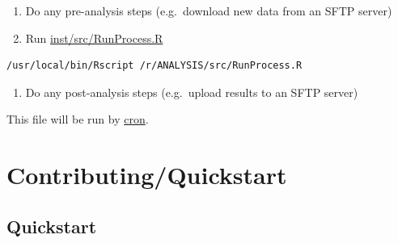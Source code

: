 \documentclass[12pt,]{article}
\providecommand{\tightlist}{%
  \setlength{\itemsep}{0pt}\setlength{\parskip}{0pt}}
\begin{document}
\begin{enumerate}
\def\labelenumi{\arabic{enumi}.}
\tightlist
\item
  Do any pre-analysis steps (e.g.~download new data from an SFTP server)
\item
  Run \protect\hyperlink{RunProcess}{inst/src/RunProcess.R}
\end{enumerate}

\begin{verbatim}
/usr/local/bin/Rscript /r/ANALYSIS/src/RunProcess.R
\end{verbatim}

\begin{enumerate}
\def\labelenumi{\arabic{enumi}.}
\setcounter{enumi}{2}
\tightlist
\item
  Do any post-analysis steps (e.g.~upload results to an SFTP server)
\end{enumerate}

This file will be run by \protect\hyperlink{cron}{cron}.

\section{Contributing/Quickstart}\label{contributingquickstart}

\hypertarget{quickstart}{\subsection{Quickstart}\label{quickstart}}
\end{document}
